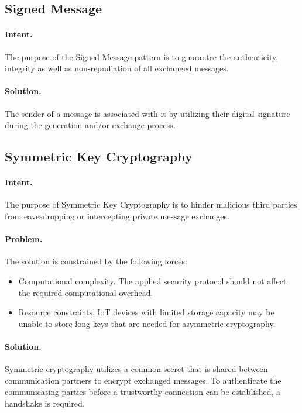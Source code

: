\subsection{Signed Message~\cite{Papoutsakis2021}} 
\label{p:sm}

\paragraph{\textbf{Intent.}} The purpose of the Signed Message pattern is to guarantee the authenticity, integrity as well as non-repudiation of all exchanged messages.

\paragraph{\textbf{Solution.}} The sender of a message is associated with it by utilizing their digital signature during the generation and/or exchange process.


\subsection{Symmetric Key Cryptography~\cite{Sinnhofer2016}}
\label{p:crypto}

\paragraph{\textbf{Intent.}} The purpose of Symmetric Key Cryptography is to hinder malicious third parties from eavesdropping or intercepting private message exchanges. 

\paragraph{\textbf{Problem.}} The solution is constrained by the following forces:
\begin{itemize}
	\item Computational complexity. The applied security protocol should not affect the required computational overhead.
	\item Resource constraints. IoT devices with limited storage capacity may be unable to store long keys that are needed for asymmetric cryptography.
\end{itemize}

\paragraph{\textbf{Solution.}} Symmetric cryptography utilizes a common secret that is shared between communication partners to encrypt exchanged messages. To authenticate the communicating parties before a trustworthy connection can be established, a handshake is required.


